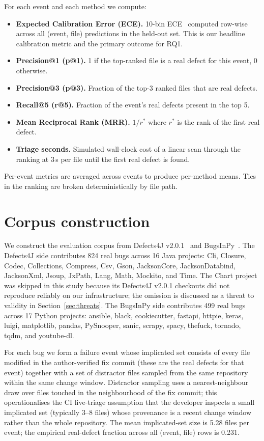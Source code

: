 \documentclass[preprint,12pt]{elsarticle}
\begin{document}
For each event and each method we compute:
\begin{itemize}
\item \textbf{Expected Calibration Error (ECE).} 10-bin ECE~\cite{guo2017calibration} computed row-wise across all (event, file) predictions in the held-out set. This is our headline calibration metric and the primary outcome for RQ1.
\item \textbf{Precision@1 (p@1).} 1 if the top-ranked file is a real defect for this event, 0 otherwise.
\item \textbf{Precision@3 (p@3).} Fraction of the top-3 ranked files that are real defects.
\item \textbf{Recall@5 (r@5).} Fraction of the event's real defects present in the top 5.
\item \textbf{Mean Reciprocal Rank (MRR).} $1 / r^*$ where $r^*$ is the rank of the first real defect.
\item \textbf{Triage seconds.} Simulated wall-clock cost of a linear scan through the ranking at 3\,s per file until the first real defect is found.
\end{itemize}
Per-event metrics are averaged across events to produce per-method means. Ties in the ranking are broken deterministically by file path.

\section{Corpus construction}
\label{sec:corpus}

We construct the evaluation corpus from Defects4J v2.0.1~\cite{just2014defects4j} and BugsInPy~\cite{widyasari2020bugsinpy}. The Defects4J side contributes 824 real bugs across 16 Java projects: Cli, Closure, Codec, Collections, Compress, Csv, Gson, JacksonCore, JacksonDatabind, JacksonXml, Jsoup, JxPath, Lang, Math, Mockito, and Time. The Chart project was skipped in this study because its Defects4J v2.0.1 checkouts did not reproduce reliably on our infrastructure; the omission is discussed as a threat to validity in Section~\ref{sec:threats}. The BugsInPy side contributes 499 real bugs across 17 Python projects: ansible, black, cookiecutter, fastapi, httpie, keras, luigi, matplotlib, pandas, PySnooper, sanic, scrapy, spacy, thefuck, tornado, tqdm, and youtube-dl.

For each bug we form a failure event whose implicated set consists of every file modified in the author-verified fix commit (these are the real defects for that event) together with a set of distractor files sampled from the same repository within the same change window. Distractor sampling uses a nearest-neighbour draw over files touched in the neighbourhood of the fix commit; this operationalises the CI live-triage assumption that the developer inspects a small implicated set (typically 3--8 files) whose provenance is a recent change window rather than the whole repository. The mean implicated-set size is 5.28 files per event; the empirical real-defect fraction across all (event, file) rows is 0.231.
\end{document}
